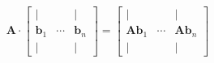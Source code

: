 \begin{align*}
\mathbf{A} \cdot
\begin{bmatrix}
\vert &        & \vert \\
\mathbf{b}_1 & \cdots & \mathbf{b}_n \\
\vert &        & \vert
\end{bmatrix}
=
\begin{bmatrix}
\vert &        & \vert \\
\mathbf{A} \mathbf{b}_1 & \cdots & \mathbf{A} \mathbf{b}_n \\
\vert &        & \vert
\end{bmatrix}
\end{align*}
